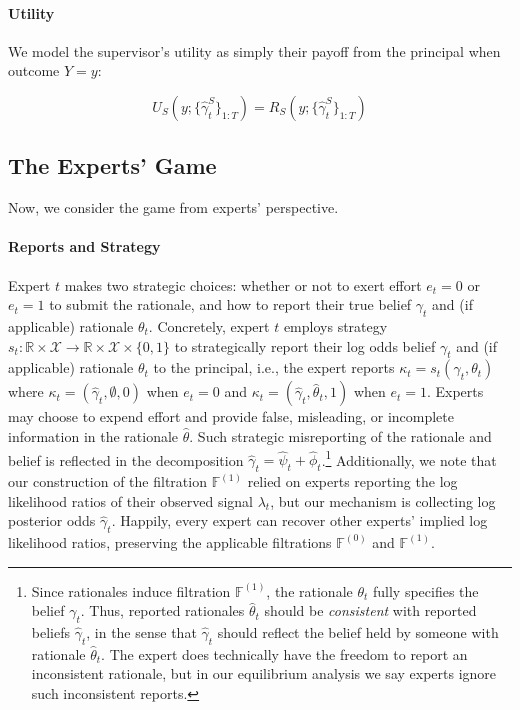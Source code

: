 \documentclass{winnower}
\begin{document}
\paragraph{Utility} We model the supervisor's utility as simply their payoff from the principal when outcome $Y=y$:

\begin{equation}
    U_S\left(y; \{\hat{\gamma}_t^{S}\}_{1:T}\right) =  R_S\left(y; \{\hat{\gamma}_t^{S}\}_{1:T}\right)
\end{equation}



\subsection{The Experts' Game}\label{sec:exp}

Now, we consider the game from experts' perspective. 

\paragraph{Reports and Strategy} Expert $t$ makes two strategic choices: whether or not to exert effort $e_t=0$ or $e_t=1$ to submit the rationale, and how to report their true belief ${\gamma}_t$ and (if applicable) rationale ${\theta}_t$. Concretely, expert $t$ employs strategy $s_t: \mathbb{R} \times \mathcal{X} \rightarrow \mathbb{R} \times \mathcal{X} \times \{0, 1\}$ to strategically report their log odds belief $\gamma_t$ and (if applicable) rationale $\theta_t$ to the principal, i.e., the expert reports $\kappa_t = s_t(\gamma_t, \theta_t)$ where $\kappa_t = (\hat{\gamma}_t, \emptyset, 0)$ when $e_t=0$ and $\kappa_t = (\hat{\gamma}_t, \hat{\theta}_t, 1)$ when $e_t =1$. Experts may choose to expend effort and provide false, misleading, or incomplete information in the rationale $\hat{\theta}$. Such strategic misreporting of the rationale and belief is reflected in the decomposition $\hat{\gamma}_t = \hat{\psi}_t + \hat{\phi}_t$.\footnote{Since rationales induce filtration $\mathbb{F}^{(1)}$, the rationale $\theta_t$ fully specifies the belief $\gamma_t$. Thus, reported rationales $\hat{\theta}_t$ should be \emph{consistent} with reported beliefs $\hat{\gamma}_t$, in the sense that $\hat{\gamma}_t$ should reflect the belief held by someone with rationale $\hat{\theta}_t$. The expert does technically have the freedom to report an inconsistent rationale, but in our equilibrium analysis we say experts ignore such inconsistent reports.} Additionally, we note that our construction of the filtration $\mathbb{F}^{(1)}$ relied on experts reporting the log likelihood ratios of their observed signal $\lambda_t$, but our mechanism is collecting log posterior odds $\hat{\gamma}_t$. Happily, every expert can recover other experts' implied log likelihood ratios, preserving the applicable filtrations $\mathbb{F}^{(0)}$ and $\mathbb{F}^{(1)}$.
\end{document}
